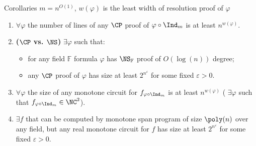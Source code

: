 \newcommand{\ba}{{\color{blue} $\boldsymbol{\forall}$}}
\newcommand{\be}{{\color{blue} $\boldsymbol{\exists}$}}

\begin{frame}{Corollaries}
    $m = n^{O(1)}$, $w(\varphi)$ is the least width of resolution proof of $\varphi$

    \pause
    \begin{enumerate}
        \item \ba $\varphi$ the number of lines of any $\CP$ proof of $\varphi \circ \Ind_m$ is at least
            $n^{w(\varphi)}$.
        \pause
        \item \textbf{($\CP$ vs. $\NS$)} \be $\varphi$ such that:
            \begin{itemize}
                \item for any field $\mathbb{F}$ formula $\varphi$ has $\NS_{\mathbb{F}}$ proof of
                    $O(\log(n))$ degree;
                \item any $\CP$ proof of $\varphi$ has size at least $2^{n^{\varepsilon}}$ for some fixed
                    $\varepsilon > 0$.
            \end{itemize}
        \pause
        \vspace{0.4cm}    
        \item \ba $\varphi$ the size of any monotone circuit for $f_{\varphi \circ \Ind_m}$ is at least
            $n^{w(\varphi)}$ (\be $\varphi$ such that $f_{\varphi \circ \Ind_m} \in \NC^2$).
        \pause
        \item \be $f$ that can be computed by monotone span program of size $\poly(n)$ over any field,
            but any real monotone circuit for $f$ has size at least $2^{n^{\varepsilon}}$ for some fixed
            $\varepsilon > 0$.
    \end{enumerate}
\end{frame}

